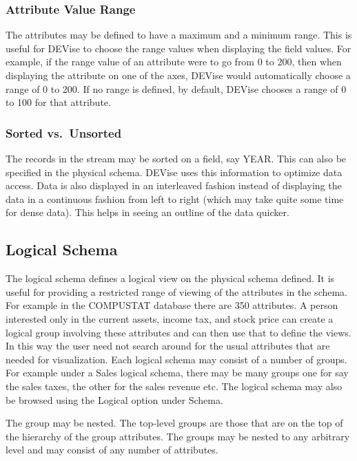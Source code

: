 \subsubsection{Attribute Value Range}

The attributes may be defined to have a maximum and a minimum
range. This is useful for DEVise to choose the range values when
displaying the field values. For example, if the range value of an
attribute were to go from 0 to 200, then when displaying the attribute
on one of the axes, DEVise would automatically choose a range of 0 to
200. If no range is defined, by default, DEVise chooses a range of 0
to 100 for that attribute.

\subsubsection{Sorted vs.\ Unsorted}

The records in the stream may be sorted on a field, say YEAR. This can
also be specified in the physical schema. DEVise uses this
information to optimize data access. Data is also displayed in an
interleaved fashion instead of displaying the data in a continuous
fashion from left to right (which may take quite some time for dense
data). This helps in seeing an outline of the data quicker.

\subsection{Logical Schema}

The logical schema defines a logical view on the physical schema
defined. It is useful for providing a restricted range of viewing of
the attributes in the schema. For example in the COMPUSTAT database
there are 350 attributes. A person interested only in the current
assets, income tax, and stock price can create a logical group
involving these attributes and can then use that to define the
views. In this way the user need not search around for the usual
attributes that are needed for visualization. Each logical schema may
consist of a number of groups. For example under a Sales logical
schema, there may be many groups one for say the sales taxes, the
other for the sales revenue etc. The logical schema may also be
browsed using the Logical option under Schema.

The group may be nested. The top-level groups are those that are on
the top of the hierarchy of the group attributes. The groups may be
nested to any arbitrary level and may consist of any number of
attributes.

